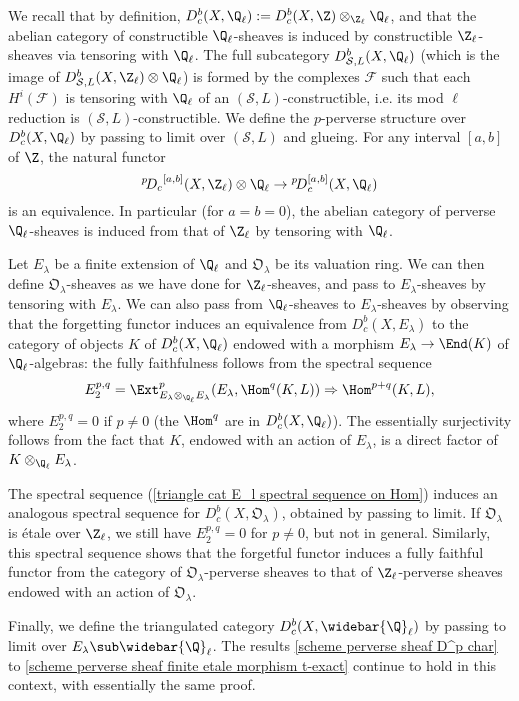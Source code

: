 We recall that by definition, $D^b_c(X,\Q_\ell):=D^b_c(X,\Z)\otimes_{\Z_\ell}\Q_\ell$, and that the abelian category of constructible $\Q_\ell$-sheaves is induced by constructible $\Z_\ell$-sheaves via tensoring with $\Q_\ell$. The full subcategory $D^b_{\mathcal{S},L}(X,\Q_\ell)$ (which is the image of $D^b_{\mathcal{S},L}(X,\Z_\ell)\otimes\Q_\ell$) is formed by the complexes $\mathscr{F}$ such that each $H^i(\mathscr{F})$ is tensoring with $\Q_\ell$ of an $(\mathcal{S},L)$-constructible, i.e. its mod $\ell$ reduction is $(\mathcal{S},L)$-constructible. We define the $p$-perverse structure over $D^b_c(X,\Q_\ell)$ by passing to limit over $(\mathcal{S},L)$ and glueing. For any interval $[a,b]$ of $\Z$, the natural functor
\[{^p\!D_c}^{[a,b]}(X,\Z_\ell)\otimes\Q_\ell\to {^p\!D}_c^{[a,b]}(X,\Q_\ell)\]
is an equivalence. In particular (for $a=b=0$), the abelian category of perverse $\Q_\ell$-sheaves is induced from that of $\Z_\ell$ by tensoring with $\Q_\ell$.\par

Let $E_\lambda$ be a finite extension of $\Q_\ell$ and $\mathfrak{O}_\lambda$ be its valuation ring. We can then define $\mathfrak{O}_\lambda$-sheaves as we have done for $\Z_\ell$-sheaves, and pass to $E_\lambda$-sheaves by tensoring with $E_\lambda$. We can also pass from $\Q_\ell$-sheaves to $E_\lambda$-sheaves by observing that the forgetting functor induces an equivalence from $D^b_c(X,E_\lambda)$ to the category of objects $K$ of $D^b_c(X,\Q_\ell)$ endowed with a morphism $E_\lambda\to\End(K)$ of $\Q_\ell$-algebras: the fully faithfulness follows from the spectral sequence 
\begin{equation}\label{triangle cat E_l spectral sequence on Hom}
E_2^{p,q}=\Ext_{E_\lambda\otimes_{\Q_\ell}E_\lambda}^p(E_\lambda,\Hom^q(K,L))\Rightarrow\Hom^{p+q}(K,L),
\end{equation}
where $E_2^{p,q}=0$ if $p\neq 0$ (the $\Hom^q$ are in $D^b_c(X,\Q_\ell)$). The essentially surjectivity follows from the fact that $K$, endowed with an action of $E_\lambda$, is a direct factor of $K\otimes_{\Q_\ell}E_\lambda$.\par
The spectral sequence (\ref{triangle cat E_l spectral sequence on Hom}) induces an analogous spectral sequence for $D^b_c(X,\mathfrak{O}_\lambda)$, obtained by passing to limit. If $\mathfrak{O}_\lambda$ is \'etale over $\Z_\ell$, we still have $E_2^{p,q}=0$ for $p\neq 0$, but not in general. Similarly, this spectral sequence shows that the forgetful functor induces a fully faithful functor from the category of $\mathfrak{O}_\lambda$-perverse sheaves to that of $\Z_\ell$-perverse sheaves endowed with an action of $\mathfrak{O}_\lambda$.\par
Finally, we define the triangulated category $D^b_c(X,\widebar{\Q}_\ell)$ by passing to limit over $E_\lambda\sub\widebar{\Q}_\ell$. The results \cref{scheme perverse sheaf D^p char} to \cref{scheme perverse sheaf finite etale morphism t-exact} continue to hold in this context, with essentially the same proof.

